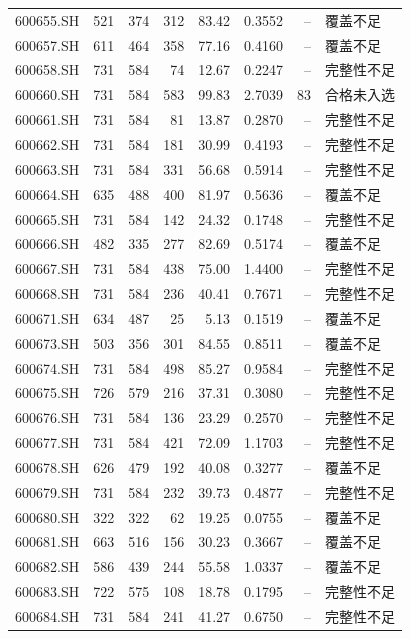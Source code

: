 \documentclass[10pt,a4paper]{article}
\begin{document}
\begin{longtable}{lrrr r r r l}
600655.SH & 521 & 374 & 312 & 83.42 & 0.3552 & -- & 覆盖不足\\
600657.SH & 611 & 464 & 358 & 77.16 & 0.4160 & -- & 覆盖不足\\
600658.SH & 731 & 584 & 74 & 12.67 & 0.2247 & -- & 完整性不足\\
600660.SH & 731 & 584 & 583 & 99.83 & 2.7039 & 83 & 合格未入选\\
600661.SH & 731 & 584 & 81 & 13.87 & 0.2870 & -- & 完整性不足\\
600662.SH & 731 & 584 & 181 & 30.99 & 0.4193 & -- & 完整性不足\\
600663.SH & 731 & 584 & 331 & 56.68 & 0.5914 & -- & 完整性不足\\
600664.SH & 635 & 488 & 400 & 81.97 & 0.5636 & -- & 覆盖不足\\
600665.SH & 731 & 584 & 142 & 24.32 & 0.1748 & -- & 完整性不足\\
600666.SH & 482 & 335 & 277 & 82.69 & 0.5174 & -- & 覆盖不足\\
600667.SH & 731 & 584 & 438 & 75.00 & 1.4400 & -- & 完整性不足\\
600668.SH & 731 & 584 & 236 & 40.41 & 0.7671 & -- & 完整性不足\\
600671.SH & 634 & 487 & 25 & 5.13 & 0.1519 & -- & 覆盖不足\\
600673.SH & 503 & 356 & 301 & 84.55 & 0.8511 & -- & 覆盖不足\\
600674.SH & 731 & 584 & 498 & 85.27 & 0.9584 & -- & 完整性不足\\
600675.SH & 726 & 579 & 216 & 37.31 & 0.3080 & -- & 完整性不足\\
600676.SH & 731 & 584 & 136 & 23.29 & 0.2570 & -- & 完整性不足\\
600677.SH & 731 & 584 & 421 & 72.09 & 1.1703 & -- & 完整性不足\\
600678.SH & 626 & 479 & 192 & 40.08 & 0.3277 & -- & 覆盖不足\\
600679.SH & 731 & 584 & 232 & 39.73 & 0.4877 & -- & 完整性不足\\
600680.SH & 322 & 322 & 62 & 19.25 & 0.0755 & -- & 覆盖不足\\
600681.SH & 663 & 516 & 156 & 30.23 & 0.3667 & -- & 覆盖不足\\
600682.SH & 586 & 439 & 244 & 55.58 & 1.0337 & -- & 覆盖不足\\
600683.SH & 722 & 575 & 108 & 18.78 & 0.1795 & -- & 完整性不足\\
600684.SH & 731 & 584 & 241 & 41.27 & 0.6750 & -- & 完整性不足\\

\end{longtable}
\end{document}
